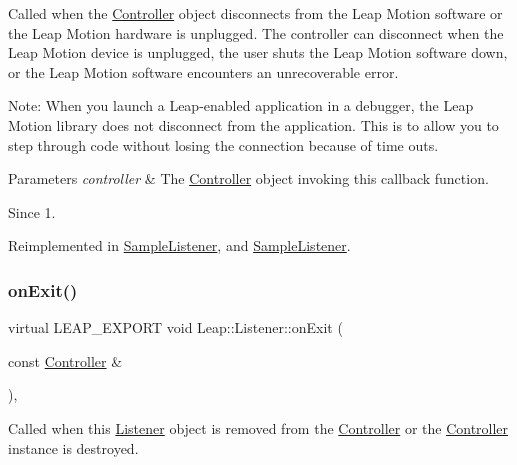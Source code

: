 Called when the \hyperlink{class_leap_1_1_controller}{Controller} object disconnects from the Leap Motion software or the Leap Motion hardware is unplugged. The controller can disconnect when the Leap Motion device is unplugged, the user shuts the Leap Motion software down, or the Leap Motion software encounters an unrecoverable error.


\begin{DoxyCodeInclude}
\end{DoxyCodeInclude}


Note\+: When you launch a Leap-\/enabled application in a debugger, the Leap Motion library does not disconnect from the application. This is to allow you to step through code without losing the connection because of time outs.


\begin{DoxyParams}{Parameters}
{\em controller} & The \hyperlink{class_leap_1_1_controller}{Controller} object invoking this callback function. \\
\hline
\end{DoxyParams}
\begin{DoxySince}{Since}
1. 
\end{DoxySince}


Reimplemented in \hyperlink{class_sample_listener_a8df4ceac8fd1b88ce4bacbb068234315}{Sample\+Listener}, and \hyperlink{class_sample_listener_ade7366cefc72f74663f892c2c97b7554}{Sample\+Listener}.

\mbox{\label{class_leap_1_1_listener_ac8f779a9208101f0084953560923f88c}} 
\subsubsection{\texorpdfstring{on\+Exit()}{onExit()}}
{\footnotesize\ttfamily virtual L\+E\+A\+P\+\_\+\+E\+X\+P\+O\+RT void Leap\+::\+Listener\+::on\+Exit (\begin{DoxyParamCaption}\item[{const \hyperlink{class_leap_1_1_controller}{Controller} \&}]{ }\end{DoxyParamCaption})\hspace{0.3cm}{\ttfamily [inline]}, {\ttfamily [virtual]}}

Called when this \hyperlink{class_leap_1_1_listener}{Listener} object is removed from the \hyperlink{class_leap_1_1_controller}{Controller} or the \hyperlink{class_leap_1_1_controller}{Controller} instance is destroyed.



